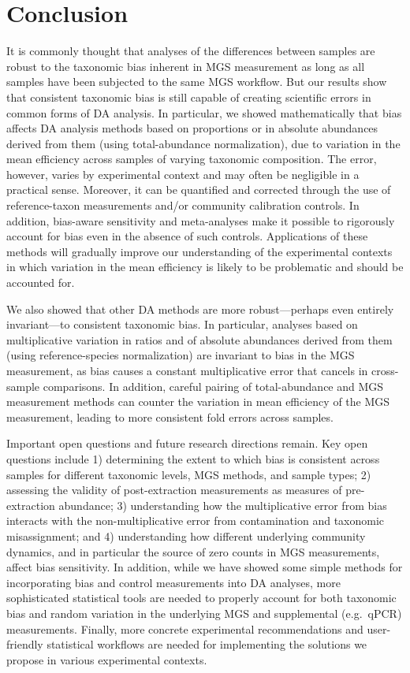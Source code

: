 \documentclass[
]{article}
\begin{document}
\hypertarget{conclusion}{%
\section{Conclusion}\label{conclusion}}

It is commonly thought that analyses of the differences between samples are robust to the taxonomic bias inherent in MGS measurement as long as all samples have been subjected to the same MGS workflow.
But our results show that consistent taxonomic bias is still capable of creating scientific errors in common forms of DA analysis.
In particular, we showed mathematically that bias affects DA analysis methods based on proportions or in absolute abundances derived from them (using total-abundance normalization), due to variation in the mean efficiency across samples of varying taxonomic composition.
The error, however, varies by experimental context and may often be negligible in a practical sense.
Moreover, it can be quantified and corrected through the use of reference-taxon measurements and/or community calibration controls.
In addition, bias-aware sensitivity and meta-analyses make it possible to rigorously account for bias even in the absence of such controls.
Applications of these methods will gradually improve our understanding of the experimental contexts in which variation in the mean efficiency is likely to be problematic and should be accounted for.

We also showed that other DA methods are more robust---perhaps even entirely invariant---to consistent taxonomic bias.
In particular, analyses based on multiplicative variation in ratios and of absolute abundances derived from them (using reference-species normalization) are invariant to bias in the MGS measurement, as bias causes a constant multiplicative error that cancels in cross-sample comparisons.
In addition, careful pairing of total-abundance and MGS measurement methods can counter the variation in mean efficiency of the MGS measurement, leading to more consistent fold errors across samples.

Important open questions and future research directions remain.
Key open questions include 1) determining the extent to which bias is consistent across samples for different taxonomic levels, MGS methods, and sample types; 2) assessing the validity of post-extraction measurements as measures of pre-extraction abundance; 3) understanding how the multiplicative error from bias interacts with the non-multiplicative error from contamination and taxonomic misassignment; and 4) understanding how different underlying community dynamics, and in particular the source of zero counts in MGS measurements, affect bias sensitivity.
In addition, while we have showed some simple methods for incorporating bias and control measurements into DA analyses, more sophisticated statistical tools are needed to properly account for both taxonomic bias and random variation in the underlying MGS and supplemental (e.g.~qPCR) measurements.
Finally, more concrete experimental recommendations and user-friendly statistical workflows are needed for implementing the solutions we propose in various experimental contexts.
\end{document}
